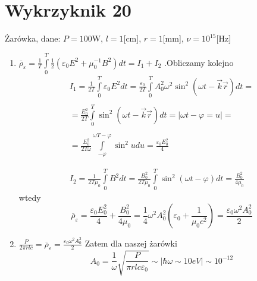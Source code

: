 \documentclass[a4paper,12pt]{article}
\begin{document}
\section{Wykrzyknik 20}
Żarówka, dane: $P=100$W, $l = 1$[cm], $r=1$[mm], $\nu=10^{15}$[Hz]
\begin{enumerate}
	\item $\overline{\rho}_\varepsilon  = \frac{1}{T}\int\limits_0^T\frac{1}{2}(\varepsilon_0E^2+\mu_0^{-1}B^2)dt = I_1+I_2$
	.Obliczamy kolejno
	$$
	\begin{gathered}
	I_1 = \frac{1}{2T}\int\limits_0^T\varepsilon_0E^2 dt = \frac{\varepsilon_0}{2T}\int\limits_0^TA_0^2\omega^2\sin^2(\omega t -\vec{k}\vec{r})dt = \\\\
	= \frac{E_0^2}{2T}\int\limits_0^T\sin^2(\omega t -\vec{k}\vec{r})dt = \big\vert \omega t - \varphi = u\big\vert = \\\\
	= \frac{E_0^2}{2T\omega}\int\limits_{-\varphi}^{\omega T-\varphi}\sin^2u du = \frac{\varepsilon_0 E_0^2}{4} \\\\\\
	I_2 = \frac{1}{2T\mu_0}\int\limits_0^T B^2 dt = \frac{B_0^2}{2T\mu_0}\int\limits_0^T\sin^2(\omega t -\varphi)dt = \frac{B_0^2}{4\mu_0}
	\end{gathered}
	$$
	wtedy 
	$$
	\overline{\rho}_\varepsilon = \frac{\varepsilon_0 E_0^2}{4}+ \frac{B_0^2}{4\mu_0} = \frac{1}{4}\omega^2A_0^2(\varepsilon_0+\frac{1}{\mu_0c^2})=\frac{\varepsilon_0\omega^2A_0^2}{2}
	$$
	\item $\frac{P}{2\pi r l c} = \overline{\rho}_\varepsilon = \frac{\varepsilon_0\omega^2A_0^2}{2}$
	Zatem dla naszej żarówki 
	$$
	A_0 = \frac{1}{\omega}\sqrt{\frac{P}{\pi r l c \varepsilon_0}} \sim \big\vert \hbar \omega \sim 10eV\big\vert \sim 10^{-12}
	$$
\end{enumerate}
\end{document}
